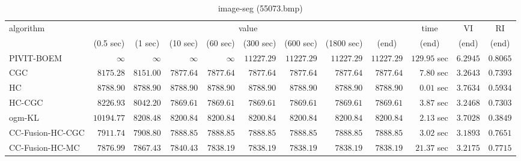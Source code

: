 \begin{table}[H]
\scriptsize
\centering
\caption{image-seg (55073.bmp)}
\label{tab:anytimetable-image-seg-55073.bmp}
\begin{tabular}{lrrrrrrrrrrr}
\toprule
           algorithm &                                   \multicolumn{8}{c}{value} & \multicolumn{1}{c}{time}    & \multicolumn{1}{c}{VI}  & \multicolumn{1}{c}{RI} \\  
\cmidrule(lr){2-9}\cmidrule(lr){10-10} \cmidrule(lr){11-11} \cmidrule(lr){12-12}   
                     & \multicolumn{1}{c}{(0.5 sec)} & \multicolumn{1}{c}{(1 sec)} & \multicolumn{1}{c}{(10 sec)} & \multicolumn{1}{c}{(60 sec)} & \multicolumn{1}{c}{(300 sec)} & \multicolumn{1}{c}{(600 sec)} & \multicolumn{1}{c}{(1800 sec)} & \multicolumn{1}{c}{(end)} & \multicolumn{1}{c}{(end)}    & \multicolumn{1}{c}{(end)}   & \multicolumn{1}{c}{(end)}  \\ \midrule 
          PIVIT-BOEM & $\infty$ & $\infty$ & $\infty$ & $\infty$ & $     11227.29$ & $     11227.29$ & $     11227.29$ & $     11227.29$ & $       129.95$ sec    & $       6.2945$  & $       0.8065$ \\ 
                 CGC & $      8175.28$ & $      8151.00$ & $      7877.64$ & $      7877.64$ & $      7877.64$ & $      7877.64$ & $      7877.64$ & $      7877.64$ & $         7.80$ sec    & $       3.2643$  & $       0.7393$ \\ 
                  HC & $      8788.90$ & $      8788.90$ & $      8788.90$ & $      8788.90$ & $      8788.90$ & $      8788.90$ & $      8788.90$ & $      8788.90$ & $         0.01$ sec    & $       3.7634$  & $       0.5934$ \\ 
              HC-CGC & $      8226.93$ & $      8042.20$ & $      7869.61$ & $      7869.61$ & $      7869.61$ & $      7869.61$ & $      7869.61$ & $      7869.61$ & $         3.87$ sec    & $       3.2468$  & $       0.7303$ \\ 
              ogm-KL & $     10194.77$ & $      8208.48$ & $      8200.84$ & $      8200.84$ & $      8200.84$ & $      8200.84$ & $      8200.84$ & $      8200.84$ & $         2.13$ sec    & $       3.7028$  & $       0.3849$ \\ 
    CC-Fusion-HC-CGC & $      7911.74$ & $      7908.80$ & $      7888.85$ & $      7888.85$ & $      7888.85$ & $      7888.85$ & $      7888.85$ & $      7888.85$ & $         3.02$ sec    & $       3.1893$  & $       0.7651$ \\ 
     CC-Fusion-HC-MC & $      7876.99$ & $      7867.43$ & $      7840.43$ & $      7838.19$ & $      7838.19$ & $      7838.19$ & $      7838.19$ & $      7838.19$ & $        21.37$ sec    & $       3.2175$  & $       0.7715$ \\ 

\end{tabular}
\end{table}
